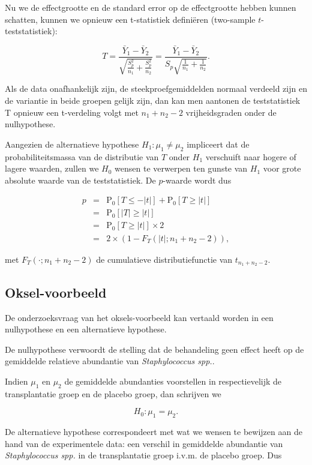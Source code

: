 \documentclass[
  dutch,
  letterpaper,
  12pt]{book}
\theoremstyle{definition}
\theoremstyle{definition}
\theoremstyle{definition}
\theoremstyle{remark}
\begin{document}
Nu we de effectgrootte en de standard error op de effectgrootte hebben
kunnen schatten, kunnen we opnieuw een t-statistiek definiëren
(two-sample \(t\)-teststatistiek):

\[T = \frac{\bar{Y}_1-\bar{Y}_2}{\sqrt{\frac{S_p^2}{n_1}+\frac{S_p^2}{n_2}}} =
  \frac{\bar{Y}_1 - \bar{Y}_2}{S_p\sqrt{\frac{1}{n_1}+\frac{1}{n_2}}}.\]

Als de data onafhankelijk zijn, de steekproefgemiddelden normaal
verdeeld zijn en de variantie in beide groepen gelijk zijn, dan kan men
aantonen de teststatistiek T opnieuw een t-verdeling volgt met
\(n_1+n_2-2\) vrijheidsgraden onder de nulhypothese.

Aangezien de alternatieve hypothese \(H_1: \mu_1 \neq \mu_2\) impliceert
dat de probabiliteitsmassa van de distributie van \(T\) onder \(H_1\)
verschuift naar hogere of lagere waarden, zullen we \(H_0\) wensen te
verwerpen ten gunste van \(H_1\) voor grote absolute waarde van de
teststatistiek. De \(p\)-waarde wordt dus

\begin{eqnarray*}
  p&=&\text{P}_0\left[T\leq -|t|\right] + \text{P}_0\left[T\geq |t|\right]\\
  &=&\text{P}_0\left[\vert T\vert \geq \vert t \vert\right]\\
  &=&\text{P}_0\left[T \geq \vert t \vert\right]\times 2\\
  &=& 2\times(1-F_T(\vert t\vert;n_1+n_2-2)),
\end{eqnarray*}

met \(F_T(\cdot;n_1+n_2-2)\) de cumulatieve distributiefunctie van
\(t_{n_1+n_2-2}\).

\subsection{Oksel-voorbeeld}\label{oksel-voorbeeld}

De onderzoeksvraag van het oksels-voorbeeld kan vertaald worden in een
nulhypothese en een alternatieve hypothese.

De nulhypothese verwoordt de stelling dat de behandeling geen effect
heeft op de gemiddelde relatieve abundantie van \emph{Staphylococcus
spp.}.

Indien \(\mu_1\) en \(\mu_2\) de gemiddelde abundanties voorstellen in
respectievelijk de transplantatie groep en de placebo groep, dan
schrijven we

\[H_0: \mu_1=\mu_2.\]

De alternatieve hypothese correspondeert met wat we wensen te bewijzen
aan de hand van de experimentele data: een verschil in gemiddelde
abundantie van \emph{Staphylococcus spp.} in de transplantatie groep
i.v.m. de placebo groep. Dus
\end{document}
